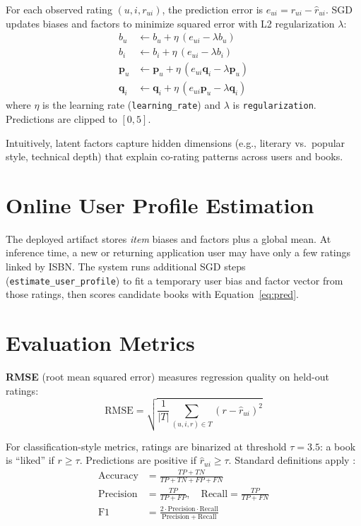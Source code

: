 \documentclass[12pt,a4paper]{report}
\begin{document}
For each observed rating $(u,i,r_{ui})$, the prediction error is $e_{ui} = r_{ui} - \hat{r}_{ui}$. SGD updates biases and factors to minimize squared error with L2 regularization $\lambda$:
\begin{align}
b_u &\leftarrow b_u + \eta\,(e_{ui} - \lambda b_u) \\
b_i &\leftarrow b_i + \eta\,(e_{ui} - \lambda b_i) \\
\mathbf{p}_u &\leftarrow \mathbf{p}_u + \eta\,(e_{ui}\mathbf{q}_i - \lambda \mathbf{p}_u) \\
\mathbf{q}_i &\leftarrow \mathbf{q}_i + \eta\,(e_{ui}\mathbf{p}_u - \lambda \mathbf{q}_i)
\end{align}
where $\eta$ is the learning rate (\texttt{learning\_rate}) and $\lambda$ is \texttt{regularization}. Predictions are clipped to $[0, 5]$.

Intuitively, latent factors capture hidden dimensions (e.g., literary vs.\ popular style, technical depth) that explain co-rating patterns across users and books.

\section{Online User Profile Estimation}

The deployed artifact stores \emph{item} biases and factors plus a global mean. At inference time, a new or returning application user may have only a few ratings linked by ISBN. The system runs additional SGD steps (\texttt{estimate\_user\_profile}) to fit a temporary user bias and factor vector from those ratings, then scores candidate books with Equation~\eqref{eq:pred}.

\section{Evaluation Metrics}

\textbf{RMSE} (root mean squared error) measures regression quality on held-out ratings:
\begin{equation}
\mathrm{RMSE} = \sqrt{\frac{1}{|T|}\sum_{(u,i,r) \in T}(r - \hat{r}_{ui})^2}
\end{equation}

For classification-style metrics, ratings are binarized at threshold $\tau = 3.5$: a book is ``liked'' if $r \geq \tau$. Predictions are positive if $\hat{r}_{ui} \geq \tau$. Standard definitions apply \cite{ir_book}:
\begin{align}
\mathrm{Accuracy} &= \frac{TP + TN}{TP + TN + FP + FN} \\
\mathrm{Precision} &= \frac{TP}{TP + FP}, \quad
\mathrm{Recall} = \frac{TP}{TP + FN} \\
\mathrm{F1} &= \frac{2 \cdot \mathrm{Precision} \cdot \mathrm{Recall}}{\mathrm{Precision} + \mathrm{Recall}}
\end{align}
\end{document}
